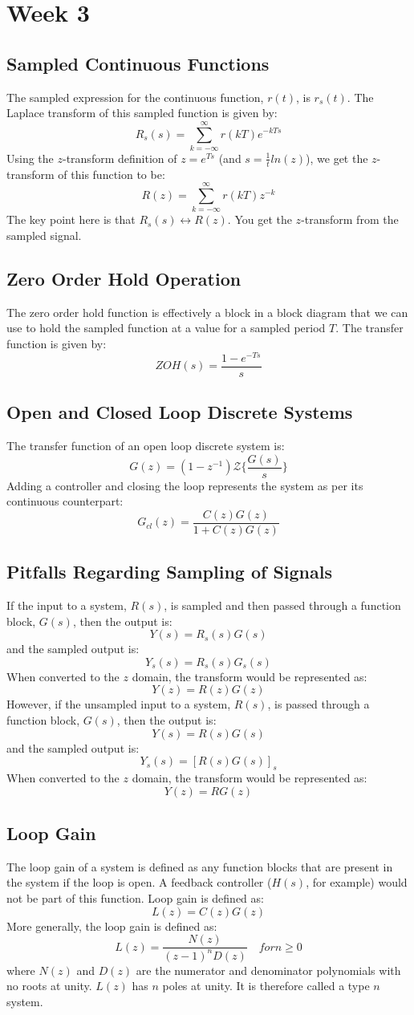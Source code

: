 \documentclass[journal]{IEEEtran}
\begin{document}
\section{\textbf{Week 3}}
\subsection{\textbf{Sampled Continuous Functions}}
The sampled expression for the continuous function, $r(t)$, is $r_s(t)$. The Laplace transform of this sampled function is given by:
\[
	R_s(s) = \sum_{k = -\infty}^{\infty} r(kT)e^{-kTs}
\]
Using the $z$-transform definition of $z = e^{Ts}$ (and $s = \frac{1}{t}ln(z)$), we get the $z$-transform of this function to be:
\[
	R(z) = \sum_{k = -\infty}^{\infty} r(kT)z^{-k}
\]
The key point here is that $R_s(s) \leftrightarrow R(z)$. You get the $z$-transform from the sampled signal.
\subsection{\textbf{Zero Order Hold Operation}}
The zero order hold function is effectively a block in a block diagram that we can use to hold the sampled function at a value for a sampled period $T$. The transfer function is given by:
\[
	ZOH(s) = \frac{1 - e^{-Ts}}{s}
\]
\subsection{\textbf{Open and Closed Loop Discrete Systems}}
The transfer function of an open loop discrete system is:
\[
	G(z) = (1 - z^{-1}) \mathcal{Z}\{\frac{G(s)}{s}\}
\]
Adding a controller and closing the loop represents the system as per its continuous counterpart:
\[
	G_{cl}(z) = \frac{C(z)G(z)}{1 + C(z)G(z)}
\]
\subsection{\textbf{Pitfalls Regarding Sampling of Signals}}
If the input to a system, $R(s)$, is sampled and then passed through a function block, $G(s)$, then the output is:
\[
	Y(s) = R_s(s)G(s)
\]
and the sampled output is:
\[
	Y_s(s) = R_s(s)G_s(s)
\]
When converted to the $z$ domain, the transform would be represented as:
\[
	Y(z) = R(z)G(z)
\]
However, if the unsampled input to a system, $R(s)$, is passed through a function block, $G(s)$, then the output is:
\[
	Y(s) = R(s)G(s)
\]
and the sampled output is:
\[
	Y_s(s) = [R(s)G(s)]_s
\]
When converted to the $z$ domain, the transform would be represented as:
\[
	Y(z) = RG(z)
\]
\subsection{\textbf{Loop Gain}}
The loop gain of a system is defined as any function blocks that are present in the system if the loop is open. A feedback controller ($H(s)$, for example) would not be part of this function. Loop gain is defined as:
\[
	L(z) = C(z)G(z)
\]
More generally, the loop gain is defined as:
\[
	L(z) = \frac{N(z)}{(z - 1)^nD(z)} \quad for n \geq 0
\]
where $N(z)$ and $D(z)$ are the numerator and denominator polynomials with no roots at unity. $L(z)$ has $n$ poles at unity. It is therefore called a type $n$ system.
\end{document}
